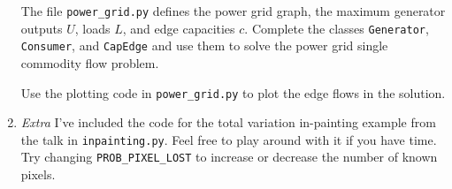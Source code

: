 \documentclass[12pt]{article}
\begin{document}
\begin{enumerate}
The file \verb+power_grid.py+ defines the power grid graph, the maximum generator outputs $U$, loads $L$, and edge capacities $c$. Complete the classes \verb+Generator+, \verb+Consumer+, and \verb+CapEdge+ and use them to solve the power grid single commodity flow problem.

Use the plotting code in \verb+power_grid.py+ to plot the edge flows in the solution.

\item\emph{Extra} I've included the code for the total variation in-painting example from the talk in \verb+inpainting.py+. Feel free to play around with it if you have time. Try changing \verb+PROB_PIXEL_LOST+ to increase or decrease the number of known pixels.

\end{enumerate}
\end{document}
